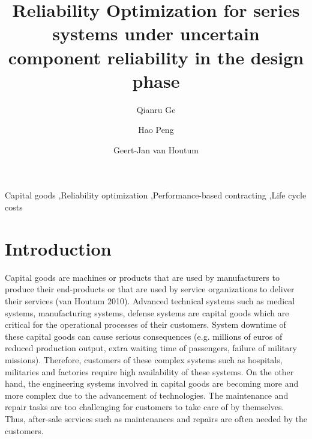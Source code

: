 \documentclass[preprint,12pt]{elsarticle}
\begin{document}
\nocite{*}

\begin{frontmatter}
\title{Reliability Optimization for series systems under uncertain component reliability in the design phase}
\author[label1]{Qianru Ge}
\author[label1]{Hao Peng}
\author[label1]{Geert-Jan van Houtum}



\address[label1]{Department of Industrial Engineering and Innovation Sciences, Eindhoven University of Technology, Eindhoven, The Netherlands}


\begin{keyword}
Capital goods \sep Reliability optimization  \sep Performance-based contracting \sep Life cycle costs
\end{keyword}
\end{frontmatter}

\section{Introduction}

Capital goods are machines or products that are used by manufacturers to produce their end-products or
that are used by service organizations to deliver their services (van Houtum 2010). Advanced technical systems such as medical systems, manufacturing systems, defense systems are capital goods which are critical for the operational processes of their customers. System downtime of these capital goods can cause serious consequences (e.g. millions of euros of reduced production output, extra waiting time of passengers, failure of military missions). Therefore, customers of these complex systems such as hospitals, militaries and factories require high availability of these systems. On the other hand, the engineering systems involved in capital goods are becoming more and more complex due to the advancement of technologies. The maintenance and repair tasks are too challenging for customers to take care of by themselves. Thus, after-sale services such as maintenances and repairs are often needed by the customers.
\end{document}
